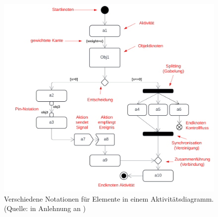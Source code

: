 \begin{figure}
    \centering
    \includegraphics[scale=0.35]{part three/Aktivitätsdiagramme/img/aktivitätsdiagramm-notation}
    \caption{Verschiedene Notationen für Elemente in einem Aktivitätsdiagramm. (Quelle: in Anlehnung an \cite[326, Abb. 6.9-16]{Bal05})}
    \label{fig:aktivitätsdiagramm-notation}
\end{figure}